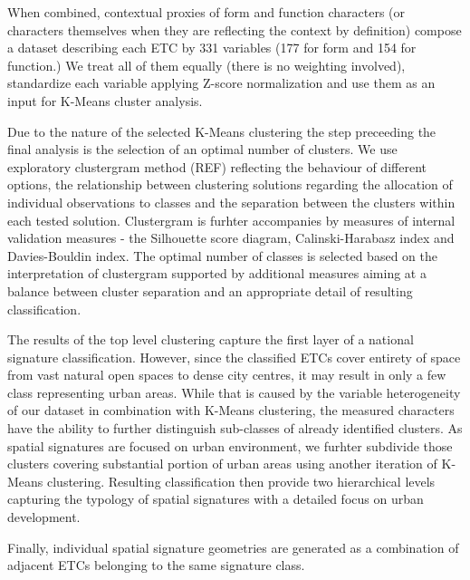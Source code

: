 When combined, contextual proxies of form and function characters (or characters
themselves when they are reflecting the context by definition) compose a dataset
describing each ETC by 331 variables (177 for form and 154 for function.) We treat all
of them equally (there is no weighting involved), standardize each variable applying
Z-score normalization and use them as an input for K-Means cluster analysis.

Due to the nature of the selected K-Means clustering the step preceeding the final
analysis is the selection of an optimal number of clusters. We use exploratory
clustergram method (REF) reflecting the behaviour of different options, the relationship
between clustering solutions regarding the allocation of individual observations to
classes and the separation between the clusters within each tested solution.
Clustergram is furhter accompanies by measures of internal validation measures - the
Silhouette score diagram, Calinski-Harabasz index and Davies-Bouldin index. The optimal
number of classes is selected based on the interpretation of clustergram supported by
additional measures aiming at a balance between cluster separation and an appropriate
detail of resulting classification.

The results of the top level clustering capture the first layer of a national signature
classification. However, since the classified ETCs cover entirety of space from vast
natural open spaces to dense city centres, it may result in only a few class
representing urban areas. While that is caused by the variable heterogeneity of our
dataset in combination with K-Means clustering, the measured characters have the ability
to further distinguish sub-classes of already identified clusters. As spatial signatures
are focused on urban environment, we furhter subdivide those clusters covering
substantial portion of urban areas using another iteration of K-Means clustering.
Resulting classification then provide two hierarchical levels capturing the typology of
spatial signatures with a detailed focus on urban development.


Finally, individual spatial signature geometries are generated as a combination of
adjacent ETCs belonging to the same signature class.

